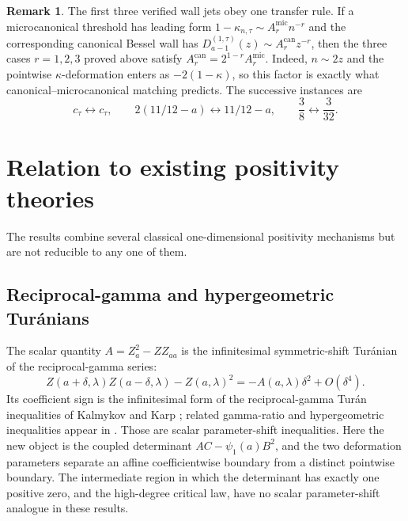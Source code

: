 \documentclass[11pt,a4paper]{amsart}
\numberwithin{equation}{section}
\theoremstyle{plain}
\theoremstyle{definition}
\newtheorem{remark}[theorem]{Remark}
\begin{document}
\begin{remark}\label{rem:jet-transfer-factor}
The first three verified wall jets obey one transfer rule.  If a
microcanonical threshold has leading form
\(1-\kappa_{n,\tau}\sim A_r^{\mathrm{mic}}n^{-r}\) and the corresponding
canonical Bessel wall has
\(D_{a-1}^{(1,\tau)}(z)\sim A_r^{\mathrm{can}}z^{-r}\), then the three cases
\(r=1,2,3\) proved above satisfy
\(A_r^{\mathrm{can}}=2^{1-r}A_r^{\mathrm{mic}}\).
Indeed, \(n\sim2z\) and the pointwise \(\kappa\)-deformation enters as
\(-2(1-\kappa)\), so this factor is exactly what canonical--microcanonical
matching predicts.  The successive instances are
\[
 c_\tau\leftrightarrow c_\tau,\qquad
 2(11/12-a)\leftrightarrow11/12-a,\qquad
 \frac38\leftrightarrow\frac3{32}.
\]
\end{remark}

\section{Relation to existing positivity theories}\label{sec:context}

The results combine several classical one-dimensional positivity mechanisms but
are not reducible to any one of them.

\subsection{Reciprocal-gamma and hypergeometric Tur\'anians}\label{subsec:reciprocal-gamma-hypergeometric-turanians}

The scalar quantity \(A=Z_a^2-ZZ_{aa}\) is the infinitesimal symmetric-shift
Tur\'anian of the reciprocal-gamma series:
\[
 Z(a+\delta,\lambda)Z(a-\delta,\lambda)-Z(a,\lambda)^2
 =-A(a,\lambda)\delta^2+O(\delta^4).
\]
Its coefficient sign is the infinitesimal form of the reciprocal-gamma Tur\'an
inequalities of Kalmykov and Karp
\cite[Thm.~3.1 and Ex.~1]{KalmykovKarp2013Reciprocal}; related gamma-ratio and
hypergeometric inequalities appear in
\cite{KalmykovKarp2013Ratios,KalmykovKarp2014LogConcavity,KalmykovKarp2017LogConcavity,KarpSitnik2010LogConvexity,KarpZhang2024LogConcavity}.
Those are scalar parameter-shift inequalities.  Here the new object is the
coupled determinant \(AC-\psi_1(a)B^2\), and the two deformation parameters
separate an affine coefficientwise boundary from a distinct pointwise boundary.
The intermediate region in which the determinant has exactly one positive
zero, and the high-degree critical law, have no scalar parameter-shift analogue
in these results.
\end{document}
